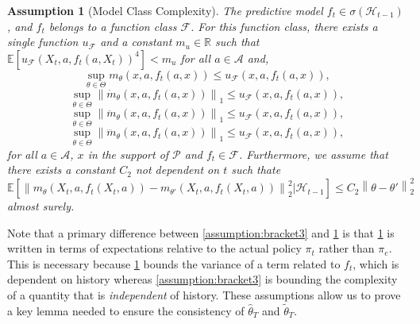\documentclass[11pt]{article}
\newcommand{\E}{\mathbb{E}}
\newcommand{\R}{\mathbb{R}}
\newcommand{\norm}[1]{\left\lVert#1\right\rVert}
\newtheorem{assumption}{Assumption}
\begin{document}
\begin{assumption}[Model Class Complexity] \label{assumption:bracket_complexity}
The predictive model $f_{t} \in \sigma(\mathcal{H}_{t-1})$, and $f_t$ belongs to a function class $\mathcal{F}$. For this function class, there exists a single function $u_{\mathcal{F}}$ and a constant $m_{u} \in \R$ such that
$\mathbb{E}[u_{\mathcal{F}}(X_t,a,f_{t}(a,X_{t}))^{4}] < m_{u}$ for all $a \in \mathcal{A}$ and,
$$\sup_{\theta \in \Theta} m_{\theta}(x,a,f_{t}(a,x)) \le u_{\mathcal{F}}(x,a,f_{t}(a,x)),$$ 
$$\sup_{\theta \in \Theta} \norm{\dot{m}_{\theta}(x,a,f_{t}(a,x))}_{1} \le u_{\mathcal{F}}(x,a,f_{t}(a,x)),$$
$$\sup_{\theta \in \Theta} \norm{\ddot{m}_{\theta}(x,a,f_{t}(a,x))}_{1} \le u_{\mathcal{F}}(x,a,f_{t}(a,x)),$$
$$\sup_{\theta \in \Theta} \norm{\dddot{m}_{\theta}(x,a,f_{t}(a,x))}_{1} \le u_{\mathcal{F}}(x,a,f_{t}(a,x)),$$
for all $a \in \mathcal{A}$, $x$ in the support of $\mathcal{P}$ and $f_{t} \in \mathcal{F}$. Furthermore, we assume that there exists a constant $C_{2}$ not dependent on $t$ such thate
$$\E\left[ \norm{m_{\theta}(X_{t},a,f_{t}(X_t,a)) - m_{\theta'}(X_{t},a,f_{t}(X_t,a))}^{2}_{2} |\mathcal{H}_{t-1} \right] \le C_{2} \norm{ \theta - \theta'}_{2}^{2}$$ almost surely. 


\end{assumption}
Note that a primary difference between \cref{assumption:bracket3} and \cref{assumption:bracket_complexity} is that \cref{assumption:bracket_complexity} is written in terms of expectations relative to the actual policy $\pi_t$ rather than $\pi_e$. This is necessary because \cref{assumption:bracket_complexity} bounds the variance of a term related to $f_t$, which is dependent on history whereas \cref{assumption:bracket3} is bounding the complexity of a quantity that is \emph{independent} of history. %
These assumptions allow us to prove a key lemma needed to ensure the consistency of $\hat{\theta}_{T}$ and $\tilde{\theta}_{T}$.
\end{document}
